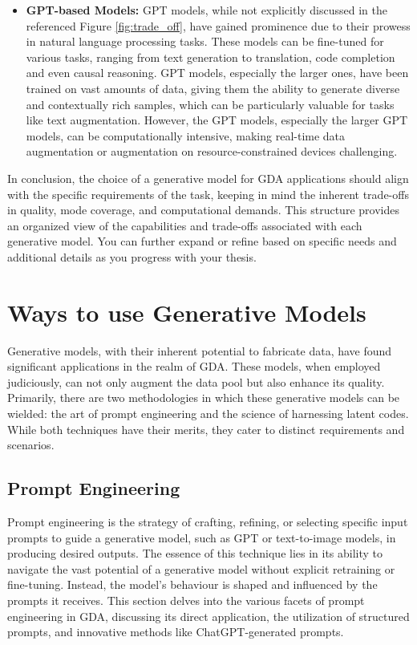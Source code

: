 \documentclass[preprint,12pt,authoryear]{elsarticle}
\begin{document}
\begin{itemize}
    \item \textbf{GPT-based Models:} GPT models, while not explicitly discussed in the referenced  Figure \ref{fig:trade_off}, have gained prominence due to their prowess in natural language processing tasks. These models can be fine-tuned for various tasks, ranging from text generation to translation, code completion and even causal reasoning.\cite{102_gpt_good} GPT models, especially the larger ones, have been trained on vast amounts of data, giving them the ability to generate diverse and contextually rich samples, which can be particularly valuable for tasks like text augmentation. However, the GPT models, especially the larger GPT models, can be computationally intensive, making real-time data augmentation or augmentation on resource-constrained devices challenging.
\end{itemize}

In conclusion, the choice of a generative model for GDA applications should align with the specific requirements of the task, keeping in mind the inherent trade-offs in quality, mode coverage, and computational demands.
This structure provides an organized view of the capabilities and trade-offs associated with each generative model. You can further expand or refine based on specific needs and additional details as you progress with your thesis.

\section{Ways to use Generative Models}

Generative models, with their inherent potential to fabricate data, have found significant applications in the realm of GDA. These models, when employed judiciously, can not only augment the data pool but also enhance its quality. Primarily, there are two methodologies in which these generative models can be wielded: the art of prompt engineering and the science of harnessing latent codes. While both techniques have their merits, they cater to distinct requirements and scenarios.

\subsection{Prompt Engineering}

Prompt engineering is the strategy of crafting, refining, or selecting specific input prompts to guide a generative model, such as GPT or text-to-image models, in producing desired outputs. The essence of this technique lies in its ability to navigate the vast potential of a generative model without explicit retraining or fine-tuning. Instead, the model's behaviour is shaped and influenced by the prompts it receives. This section delves into the various facets of prompt engineering in GDA, discussing its direct application, the utilization of structured prompts, and innovative methods like ChatGPT-generated prompts.
\end{document}
